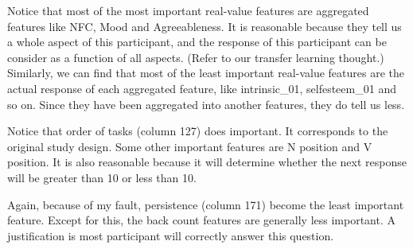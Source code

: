 \documentclass[11pt, a4paper]{article}
\begin{document}
\begin{enumerate}
\begin{itemize}
{			Notice that most of the most important real-value features are aggregated features like NFC, Mood and Agreeableness. It is reasonable because they tell us a whole aspect of this participant, and the response of this participant can be consider as a function of all aspects. (Refer to our transfer learning thought.) Similarly, we can find that most of the least important real-value features are the actual response of each aggregated feature, like intrinsic\_01, selfesteem\_01 and so on. Since they have been aggregated into another features, they do tell us less.
			
			Notice that order of tasks (column 127) does important. It corresponds to the original study design. Some other important features are N position and V position. It is also reasonable because it will determine whether the next response will be greater than 10 or less than 10.
			
			Again, because of my fault, persistence (column 171) become the least important feature. Except for this, the back count features are generally less important. A justification is most participant will correctly answer this question.}
		

\end{itemize}
\end{enumerate}
\end{document}

